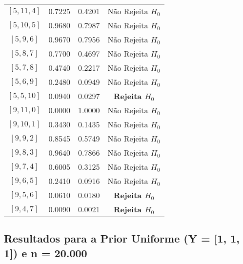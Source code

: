 \documentclass[12pt, a4paper]{article}
\begin{document}
\begin{table}[H]
\begin{tabular}{cccc}
        {$[5, 11, 4]$} & 0.7225 & 0.4201 & Não Rejeita $H_0$ \\
        {$[5, 10, 5]$} & 0.9680 & 0.7987 & Não Rejeita $H_0$ \\
        {$[5, 9, 6]$}  & 0.9670 & 0.7956 & Não Rejeita $H_0$ \\
        {$[5, 8, 7]$}  & 0.7700 & 0.4697 & Não Rejeita $H_0$ \\
        {$[5, 7, 8]$}  & 0.4740 & 0.2217 & Não Rejeita $H_0$ \\
        {$[5, 6, 9]$}  & 0.2480 & 0.0949 & Não Rejeita $H_0$ \\
        {$[5, 5, 10]$} & 0.0940 & 0.0297 & \textbf{Rejeita $H_0$} \\
        \midrule
        {$[9, 11, 0]$} & 0.0000 & 1.0000 & Não Rejeita $H_0$ \\
        {$[9, 10, 1]$} & 0.3430 & 0.1435 & Não Rejeita $H_0$ \\
        {$[9, 9, 2]$}  & 0.8545 & 0.5749 & Não Rejeita $H_0$ \\
        {$[9, 8, 3]$}  & 0.9640 & 0.7866 & Não Rejeita $H_0$ \\
        {$[9, 7, 4]$}  & 0.6005 & 0.3125 & Não Rejeita $H_0$ \\
        {$[9, 6, 5]$}  & 0.2410 & 0.0916 & Não Rejeita $H_0$ \\
        {$[9, 5, 6]$}  & 0.0610 & 0.0180 & \textbf{Rejeita $H_0$} \\
        {$[9, 4, 7]$}  & 0.0090 & 0.0021 & \textbf{Rejeita $H_0$} \\
        \bottomrule
    \end{tabular}
\end{table}

\subsection{Resultados para a Prior Uniforme (Y = [1, 1, 1]) e n = 20.000}
\end{document}
